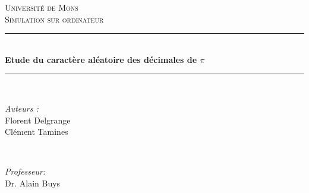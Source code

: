 \documentclass[a4paper,10pt]{article}
\begin{document}
\begin{titlepage}

\newcommand{\HRule}{\rule{\linewidth}{0.5mm}} %

\center %
 

\textsc{\LARGE Université de Mons}\\[1.5cm] %
\textsc{\Large Simulation sur ordinateur }\\[0.5cm] %


\HRule \\[0.4cm]
{ \huge \bfseries Etude du caractère aléatoire des décimales de $\pi$}\\[0.4cm] %
\HRule \\[1.5cm]
 

\begin{minipage}{0.4\textwidth}
\begin{flushleft} \large
\emph{Auteurs :}\\
Florent Delgrange \\
Clément Tamines
\end{flushleft}
\end{minipage}
~
\begin{minipage}{0.4\textwidth}
\begin{flushright} \large
\emph{Professeur:} \\
Dr. Alain Buys
\end{flushright}
\end{minipage}\\[4cm]



\end{titlepage}
\end{document}
